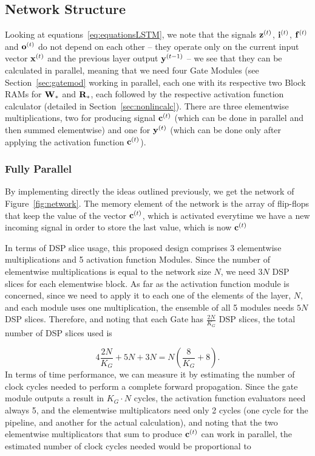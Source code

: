 \subsection{Network Structure}\label{sec:hLSTM-struct}
Looking at equations~\ref{eq:equationsLSTM}, we note that the signals $\mathbf{z}^{(t)}$, $\mathbf{i}^{(t)}$, $\mathbf{f}^{(t)}$ and $\mathbf{o}^{(t)}$ do not depend on each other -- they operate only on the current input vector $\mathbf{x}^{(t)}$ and the previous layer output $\mathbf{y}^{(t-1)}$ -- we see that they can be calculated in parallel, meaning that we need four Gate Modules (see Section~\ref{sec:gatemod} working in parallel, each one with its respective two Block RAMs for $\mathbf{W}_*$ and $\mathbf{R}_*$, each followed by the respective activation function calculator (detailed in Section~\ref{sec:nonlincalc}). There are three elementwise multiplications, two for producing signal $\mathbf{c}^{(t)}$ (which can be done in parallel and then summed elementwise) and one for $\mathbf{y}^{(t)}$ (which can be done only after applying the activation function $\mathbf{c}^{(t)}$).

\subsubsection{Fully Parallel}\label{sec:struct-fullpar}
By implementing directly the ideas outlined previously, we get the network of Figure~\ref{fig:network}. The memory element of the network is the array of flip-flops that keep the value of the vector $\mathbf{c}^{(t)}$, which is activated everytime we have a new incoming signal in order to store the last value, which is now $\mathbf{c}^{(t)}$

In terms of DSP slice usage, this proposed design comprises 3 elementwise multiplications and 5 activation function Modules. Since the number of elementwise multiplications is equal to the network size $N$, we need $3N$ DSP slices for each elementwise block. As far as the activation function module is concerned, since we need to apply it to each one of the elements of the layer, $N$, and each module uses one multiplication, the ensemble of all 5 modules needs $5N$ DSP slices. Therefore, and noting that each Gate has $\frac{2N}{K_G}$ DSP slices, the total number of DSP slices used is

\begin{equation}\label{eq:numdsp_network}
    4\frac{2N}{K_G} + 5N + 3N = N \left( \frac{8}{K_G} + 8 \right).
\end{equation}
In terms of time performance, we can measure it by estimating the number of clock cycles needed to perform a complete forward propagation. Since the gate module outputs a result in $K_G \cdot N$ cycles, the activation function evaluators need always 5, and the elementwise multiplicators need only 2 cycles (one cycle for the pipeline, and another for the actual calculation), and noting that the two elementwise multiplicators that sum to produce $\mathbf{c}^{(t)}$ can work in parallel, the estimated number of clock cycles needed would be proportional to 

